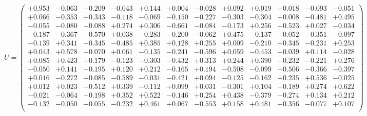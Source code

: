 \documentclass[9pt]{article}
\theoremstyle{plain}
\theoremstyle{definition}
\theoremstyle{remark}
\numberwithin{equation}{section}
\begin{document}
$U = \left(
\begin{array}{
cccccccccccc}
+0.953 & -0.063 & -0.209 & -0.043 & +0.144 & +0.004 & -0.028 & +0.092 & +0.019 & +0.018 & -0.093 & -0.051 \\
+0.066 & -0.353 & +0.343 & -0.118 & -0.069 & -0.150 & -0.227 & -0.303 & -0.304 & -0.008 & -0.481 & +0.495 \\
-0.055 & -0.080 & -0.088 & +0.274 & +0.306 & -0.661 & -0.084 & -0.173 & +0.256 & +0.523 & +0.027 & -0.034 \\
-0.187 & -0.367 & -0.570 & +0.038 & -0.283 & -0.200 & -0.062 & +0.475 & -0.137 & -0.052 & -0.351 & -0.097 \\
-0.139 & +0.341 & -0.345 & -0.485 & +0.385 & +0.128 & +0.255 & +0.009 & -0.210 & +0.345 & -0.231 & +0.253 \\
+0.043 & +0.578 & -0.070 & +0.061 & -0.135 & -0.241 & -0.596 & +0.059 & -0.453 & -0.039 & +0.114 & -0.028 \\
+0.085 & +0.423 & +0.179 & -0.123 & -0.303 & -0.432 & +0.313 & +0.244 & +0.390 & -0.232 & -0.221 & +0.276 \\
-0.050 & +0.141 & -0.195 & +0.120 & +0.212 & -0.165 & +0.194 & -0.508 & -0.099 & -0.506 & -0.366 & -0.397 \\
+0.016 & -0.272 & -0.085 & -0.589 & -0.031 & -0.421 & +0.094 & -0.125 & -0.162 & -0.235 & +0.536 & -0.025 \\
+0.012 & +0.023 & -0.512 & +0.339 & -0.112 & +0.099 & +0.031 & -0.301 & +0.104 & -0.189 & +0.274 & +0.622 \\
-0.021 & -0.064 & +0.198 & +0.352 & +0.522 & -0.146 & +0.254 & +0.438 & -0.379 & -0.274 & +0.134 & +0.212 \\
-0.132 & -0.050 & -0.055 & -0.232 & +0.461 & +0.067 & -0.553 & +0.158 & +0.481 & -0.356 & -0.077 & +0.107 \\
\end{array}
\right)$ \newline 
\end{document}
